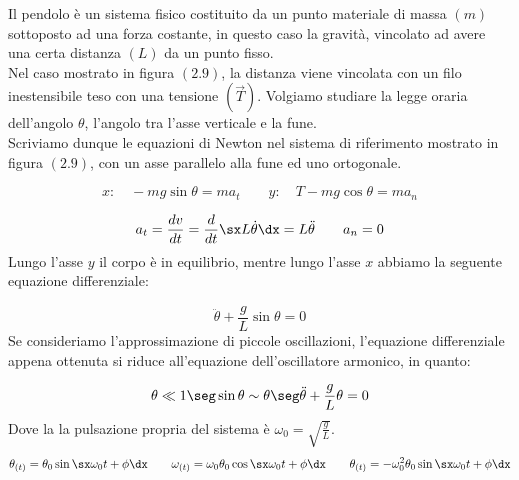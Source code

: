 Il pendolo è un sistema fisico costituito da un punto materiale di massa $(m)$ sottoposto ad una forza costante, in questo caso la gravità, vincolato ad avere una certa distanza $(L)$ da un punto fisso.\\ Nel caso mostrato in figura $(2.9)$, la distanza viene vincolata con un filo inestensibile teso con una tensione $(\vec T)$. Volgiamo studiare la legge oraria dell'angolo $\theta$, l'angolo tra l'asse verticale e la fune.\\ Scriviamo dunque le equazioni di Newton nel sistema di riferimento mostrato in figura $(2.9)$, con un asse parallelo alla fune ed uno ortogonale.

\begin{equation}
x:\quad -mg\sin\theta = ma_t\quad\quad y:\quad T-mg\cos\theta = ma_n
\end{equation}

\begin{equation}
a_t = \frac{dv}{dt}=\frac d{dt}\sx L\dot\theta\dx=L\ddot\theta\quad\quad a_n = 0
\end{equation}
Lungo l'asse $y$ il corpo è in equilibrio, mentre lungo l'asse $x$ abbiamo la seguente equazione differenziale:

\begin{equation}
\boxed{\ddot\theta + \frac gL\sin\theta = 0}
\end{equation}
Se consideriamo l'approssimazione di piccole oscillazioni, l'equazione differenziale appena ottenuta si riduce all'equazione dell'oscillatore armonico, in quanto:

\begin{equation}
\theta \ll 1 \seg \sin\theta \sim \theta \seg \ddot\theta + \frac gL\theta = 0
\end{equation}
Dove la la pulsazione propria del sistema è $\omega_0 = \sqrt{\frac gL}$.
\begin{equation}
\theta_{(t)} = \theta_0\sin\sx\omega_0t+\phi\dx\quad\quad \omega_{(t)} = \omega_0\theta_0\cos\sx\omega_0t+\phi\dx\quad\quad \theta_{(t)} =-\omega_0^2 \theta_0\sin\sx\omega_0t+\phi\dx
\end{equation}